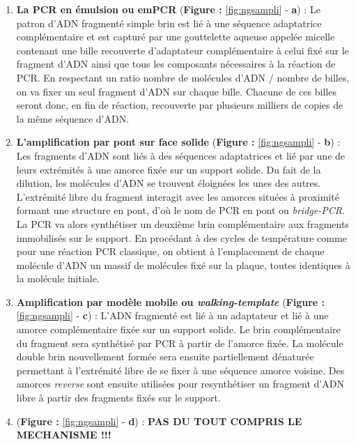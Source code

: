 \documentclass[12pt,twoside]{reedthesis}
\providecommand{\tightlist}{%
  \setlength{\itemsep}{0pt}\setlength{\parskip}{0pt}}
\theoremstyle{definition}
\theoremstyle{definition}
\theoremstyle{remark}
\begin{document}
  \begin{enumerate}
  \def\labelenumi{\arabic{enumi}.}
  \tightlist
  \item
    \textbf{La PCR en émulsion ou emPCR} (\textbf{Figure :
    }\ref{fig:ngsampli} - \textbf{a}) : Le patron d'ADN fragmenté simple
    brin est lié à une séquence adaptatrice complémentaire et est capturé
    par une gouttelette aqueuse appelée micelle contenant une bille
    recouverte d'adaptateur complémentaire à celui fixé sur le fragment
    d'ADN ainsi que tous les composants nécessaires à la réaction de PCR.
    En respectant un ratio nombre de molécules d'ADN / nombre de billes,
    on va fixer un seul fragment d'ADN sur chaque bille. Chacune de ces
    billes seront donc, en fin de réaction, recouverte par plusieurs
    milliers de copies de la même séquence d'ADN.\\
  \item
    \textbf{L'amplification par pont sur face solide} (\textbf{Figure :
    }\ref{fig:ngsampli} - \textbf{b}) : Les fragments d'ADN sont liés à
    des séquences adaptatrices et lié par une de leurs extrémités à une
    amorce fixée sur un support solide. Du fait de la dilution, les
    molécules d'ADN se trouvent éloignées les unes des autres. L'extrémité
    libre du fragment interagit avec les amorces situées à proximité
    formant une structure en pont, d'où le nom de PCR en pont ou
    \emph{bridge-PCR}. La PCR va alors synthétiser un deuxième brin
    complémentaire aux fragments immobilisés sur le support. En procédant
    à des cycles de température comme pour une réaction PCR classique, on
    obtient à l'emplacement de chaque molécule d'ADN un massif de
    molécules fixé sur la plaque, toutes identiques à la molécule
    initiale.\\
  \item
    \textbf{Amplification par modèle mobile ou \emph{walking-template}
    }(\textbf{Figure : }\ref{fig:ngsampli} - \textbf{c}) : L'ADN fragmenté
    est lié à un adaptateur et lié à une amorce complémentaire fixée sur
    un support solide. Le brin complémentaire du fragment sera synthétisé
    par PCR à partir de l'amorce fixée. La molécule double brin
    nouvellement formée sera ensuite partiellement dénaturée permettant à
    l'extrémité libre de se fixer à une séquence amorce voisine. Des
    amorces \emph{reverse} sont ensuite utilisées pour resynthétiser un
    fragment d'ADN libre à partir des fragments fixés sur le support.\\
  \item
    (\textbf{Figure : }\ref{fig:ngsampli} - \textbf{d}) : \textbf{PAS DU
    TOUT COMPRIS LE MECHANISME !!! }
  \end{enumerate}
  
\end{document}
